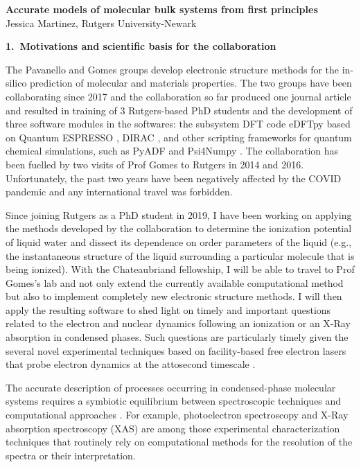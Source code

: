 \documentclass[notitlepage,12pt]{report}
\begin{document}
\renewcommand\Affilfont{\itshape\small}
\begin{center}
    \textbf{\LARGE Accurate models of molecular bulk systems from first principles}\\
    Jessica Martinez, Rutgers University-Newark
\end{center}

\textbf{\large 1.\ Motivations and scientific basis for the collaboration}

    The Pavanello and Gomes groups develop electronic structure methods for the in-silico prediction of molecular and materials properties. The two groups have been collaborating since 2017 and the collaboration so far produced one journal article \supercite{tolle2019charged} and resulted in training of 3 Rutgers-based PhD students and the development of three software modules in the softwares: the subsystem DFT code eDFTpy\supercite{edftpy} based on Quantum ESPRESSO \supercite{qe}, DIRAC \supercite{saue2020dirac}, and other scripting frameworks for quantum chemical simulations, such as PyADF \supercite{Jacob_2011} and Psi4Numpy \supercite{smith2018psi4numpy}. The collaboration has been fuelled by two visits of Prof Gomes to Rutgers in 2014 and 2016. Unfortunately, the past two years have been negatively affected by the COVID pandemic and any international travel was forbidden. 

    Since joining Rutgers as a PhD student in 2019, I have been working on applying the methods developed by the collaboration to determine the ionization potential of liquid water and dissect its dependence on order parameters of the liquid (e.g., the instantaneous structure of  the liquid surrounding a particular molecule that is being ionized).   With the Chateaubriand fellowship, I will be able to travel to Prof Gomes's lab and not only extend the currently available computational method  but also to implement completely new electronic structure methods. I will then apply the resulting software to shed light on timely and important questions related to the electron and nuclear dynamics following an ionization or an X-Ray absorption in condensed phases. Such questions are particularly timely given the several novel experimental techniques based on facility-based free electron lasers that probe electron dynamics at the attosecond timescale \supercite{Duris_2019}.  

    The accurate description of processes occurring in condensed-phase molecular systems requires a symbiotic  equilibrium between spectroscopic techniques\supercite{reimann2021two,malerz2021low,bolognesi2021combined} and computational approaches \supercite{couto2007understanding,ambrosio2016structural,ozaki2021advances}. For example, photoelectron spectroscopy \supercite{thurmer2021accurate,perry2020ionization,credidio2021quantitative,thurmer2021valence,tolle2019charged,gaiduk2018electron,gaiduk2016photoelectron,seidel2016valence} and X-Ray absorption spectroscopy (XAS)\supercite{zhovtobriukh2019liquid,zhang2020isotope,smith2020femtosecond} are among those experimental characterization techniques that routinely rely on computational methods for the resolution of the spectra or their interpretation.
	
\end{document}
